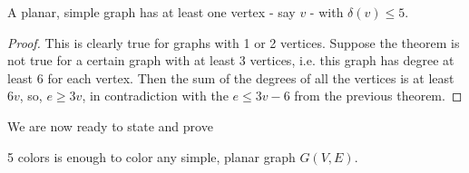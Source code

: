 \begin{theorem} A planar, simple graph has at least one
 vertex - say $v$ - with $\delta(v) \leq 5$.
\end{theorem}
\begin{proof}
This is clearly true for graphs with 1 or 2 vertices. Suppose the
theorem is not true for a certain graph with at least 3 vertices,
i.e. this graph has degree at least 6 for each vertex. Then the sum of
the degrees of all the vertices is at least $6v$, so, $e \geq 3v$,
in contradiction with the $e \leq 3v-6$ from the previous theorem.
\end{proof}

We are now ready to state and prove

 \begin{theorem} 5 colors is enough to color any simple,
     planar graph $G(V,E)$.
\end{theorem} %
